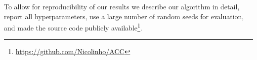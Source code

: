 
To allow for reproducibility of our results we describe our algorithm in detail, report all hyperparameters, use a large number of random seeds for evaluation, and made the source code publicly available\footnote{\url{https://github.com/Nicolinho/ACC}}. 




